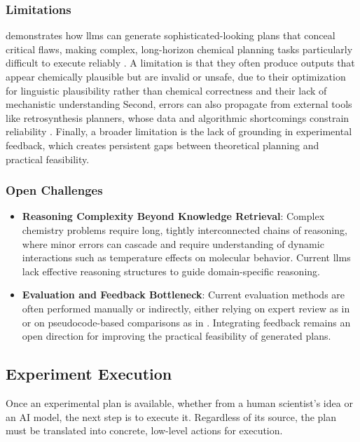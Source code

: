 \subsubsection{Limitations} 

 demonstrates how \glspl{llm} can generate sophisticated-looking plans that conceal critical flaws, making complex, long-horizon chemical planning tasks particularly difficult to execute reliably \autocite{Cao2025LargeLM}. 
A limitation is that they often produce outputs that appear chemically plausible but are invalid or unsafe, due to their optimization for linguistic plausibility rather than chemical correctness and their lack of mechanistic understanding\autocite{Bran2023TransformersAL, Evans2021TruthfulAD}
Second, errors can also propagate from external tools like retrosynthesis planners, whose data and algorithmic shortcomings constrain reliability \autocite{Li2025ChemHASHA}. 
Finally, a broader limitation is the lack of grounding in experimental feedback, which creates persistent gaps between theoretical planning and practical feasibility.

\subsubsection{Open Challenges}

\begin{itemize}
    \item \textbf{Reasoning Complexity Beyond Knowledge Retrieval}: Complex chemistry problems require long, tightly interconnected chains of reasoning, where minor errors can cascade and require understanding of dynamic interactions such as temperature effects on molecular behavior. Current \glspl{llm} lack effective reasoning structures to guide domain-specific reasoning. \autocite{Ouyang2023StructuredCR, Tang2025ChemAgentSL} 
    \item \textbf{Evaluation and Feedback Bottleneck}: Current evaluation methods are often performed manually or indirectly, either relying on expert review as in  \autocite{bran2024augmenting} or on pseudocode-based comparisons as in .\autocite{o2023bioplanner} Integrating feedback remains an open direction for improving the practical feasibility of generated plans.
\end{itemize}


\subsection{Experiment Execution}
Once an experimental plan is available, whether from a human scientist's idea or an AI model, the next step is to execute it. 
Regardless of its source, the plan must be translated into concrete, low-level actions for execution. 

